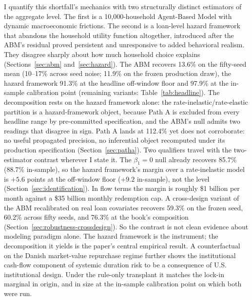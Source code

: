 \documentclass[12pt]{article}
\begin{document}
I quantify this shortfall's mechanics with two structurally distinct estimators of the aggregate level. The first is a 10,000-household Agent-Based Model with dynamic macroeconomic frictions. The second is a loan-level hazard framework that abandons the household utility function altogether, introduced after the ABM's residual proved persistent and unresponsive to added behavioral realism. They disagree sharply about how much household choice explains (Sections~\ref{sec:abm} and~\ref{sec:hazard}). The ABM recovers 13.6\% on the fifty-seed mean (10--17\% across seed noise; 11.9\% on the frozen production draw), the hazard framework 91.3\% at the headline off-window floor and 97.9\% at the in-sample calibration point (remaining variants: Table~\ref{tab:headline}). The decomposition rests on the hazard framework alone: the rate-inelastic/rate-elastic partition is a hazard-framework object, because Path A is excluded from every headline range by pre-committed specification, and the ABM's null admits two readings that disagree in sign. Path A lands at 112.4\% yet does not corroborate: no useful propagated precision, no inferential object recomputed under its production specification (Section~\ref{sec:patha}). Two qualifiers travel with the two-estimator contrast wherever I state it. The $\beta_1 = 0$ null already recovers 85.7\% (88.7\% in-sample), so the hazard framework's margin over a rate-inelastic model is $+5.6$ points at the off-window floor ($+9.2$ in-sample), not the level (Section~\ref{sec:identification}). In flow terms the margin is roughly \$1 billion per month against a \$35 billion monthly redemption cap. A cross-design variant of the ABM recalibrated on real loan covariates recovers 59.3\% on the frozen seed, 60.2\% across fifty seeds, and 76.3\% at the book's composition (Section~\ref{sec:robustness-crossdesign}). So the contrast is not clean evidence about modeling paradigm alone. The hazard framework is the instrument; the decomposition it yields is the paper's central empirical result. A counterfactual on the Danish market-value repurchase regime further shows the institutional cash-flow component of systemic duration risk to be a consequence of U.S. institutional design. Under the rule-only transplant it matches the lock-in marginal in origin, and in size at the in-sample calibration point on which both were run.
\end{document}

